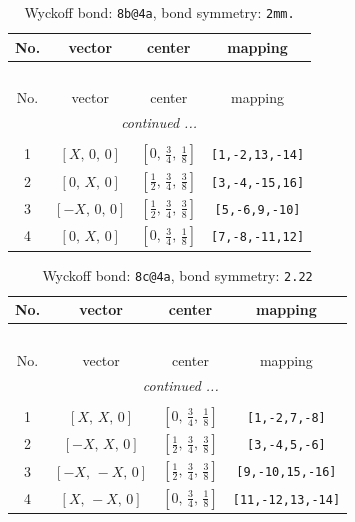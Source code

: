 \documentclass[fleqn,8pt]{jsarticle}
\begin{document}
\begin{longtable}{cccc}
\caption{Wyckoff bond: {\tt 8b@4a}, bond symmetry: {\tt 2mm.}}
 \\
 \hline \hline
No. & vector & center & mapping \\ \hline \endfirsthead

\multicolumn{3}{l}{\tablename\ \thetable{}} \\
 \hline \hline
No. & vector & center & mapping \\ \hline \endhead

 \hline \hline
\multicolumn{3}{r}{\footnotesize\it continued ...} \\ \endfoot

 \hline \hline
\multicolumn{3}{r}{} \\ \endlastfoot

1 & $\left[ X,\, 0,\, 0 \right]$ & $\left[ 0,\, \frac{3}{4},\, \frac{1}{8} \right]$ & {\tt [1,-2,13,-14]} \\ \hline
2 & $\left[ 0,\, X,\, 0 \right]$ & $\left[ \frac{1}{2},\, \frac{3}{4},\, \frac{3}{8} \right]$ & {\tt [3,-4,-15,16]} \\ \hline
3 & $\left[ - X,\, 0,\, 0 \right]$ & $\left[ \frac{1}{2},\, \frac{3}{4},\, \frac{3}{8} \right]$ & {\tt [5,-6,9,-10]} \\ \hline
4 & $\left[ 0,\, X,\, 0 \right]$ & $\left[ 0,\, \frac{3}{4},\, \frac{1}{8} \right]$ & {\tt [7,-8,-11,12]} \\
\end{longtable}
\renewcommand{\arraystretch}{1.2}
\begin{longtable}{cccc}
\caption{Wyckoff bond: {\tt 8c@4a}, bond symmetry: {\tt 2.22}}
 \\
 \hline \hline
No. & vector & center & mapping \\ \hline \endfirsthead

\multicolumn{3}{l}{\tablename\ \thetable{}} \\
 \hline \hline
No. & vector & center & mapping \\ \hline \endhead

 \hline \hline
\multicolumn{3}{r}{\footnotesize\it continued ...} \\ \endfoot

 \hline \hline
\multicolumn{3}{r}{} \\ \endlastfoot

1 & $\left[ X,\, X,\, 0 \right]$ & $\left[ 0,\, \frac{3}{4},\, \frac{1}{8} \right]$ & {\tt [1,-2,7,-8]} \\ \hline
2 & $\left[ - X,\, X,\, 0 \right]$ & $\left[ \frac{1}{2},\, \frac{3}{4},\, \frac{3}{8} \right]$ & {\tt [3,-4,5,-6]} \\ \hline
3 & $\left[ - X,\, - X,\, 0 \right]$ & $\left[ \frac{1}{2},\, \frac{3}{4},\, \frac{3}{8} \right]$ & {\tt [9,-10,15,-16]} \\ \hline
4 & $\left[ X,\, - X,\, 0 \right]$ & $\left[ 0,\, \frac{3}{4},\, \frac{1}{8} \right]$ & {\tt [11,-12,13,-14]} \\
\end{longtable}
\end{document}
